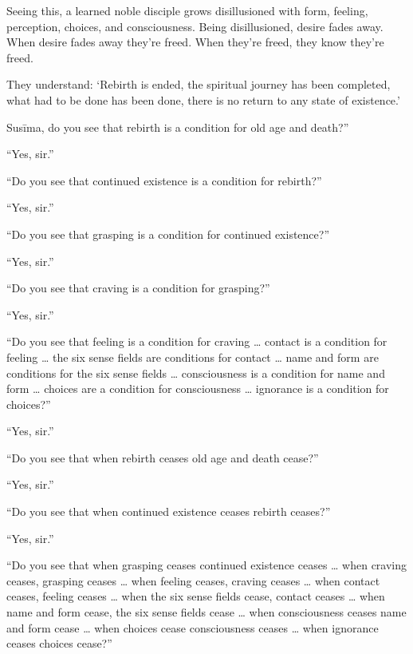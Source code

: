 \documentclass[12pt,openany]{book}%
\begin{document}
Seeing this, a learned noble disciple grows disillusioned with form, feeling, perception, choices, and consciousness. Being disillusioned, desire fades away. When desire fades away they’re freed. When they’re freed, they know they’re freed. 

They understand: ‘Rebirth is ended, the spiritual journey has been completed, what had to be done has been done, there is no return to any state of existence.’ 

\textsanskrit{Susīma}, do you see that rebirth is a condition for old age and death?” 

“Yes, sir.” 

“Do you see that continued existence is a condition for rebirth?” 

“Yes, sir.” 

“Do you see that grasping is a condition for continued existence?” 

“Yes, sir.” 

“Do you see that craving is a condition for grasping?” 

“Yes, sir.” 

“Do you see that feeling is a condition for craving … contact is a condition for feeling … the six sense fields are conditions for contact … name and form are conditions for the six sense fields … consciousness is a condition for name and form … choices are a condition for consciousness … ignorance is a condition for choices?” 

“Yes, sir.” 

“Do you see that when rebirth ceases old age and death cease?” 

“Yes, sir.” 

“Do you see that when continued existence ceases rebirth ceases?” 

“Yes, sir.” 

“Do you see that when grasping ceases continued existence ceases … when craving ceases, grasping ceases … when feeling ceases, craving ceases … when contact ceases, feeling ceases … when the six sense fields cease, contact ceases … when name and form cease, the six sense fields cease … when consciousness ceases name and form cease … when choices cease consciousness ceases … when ignorance ceases choices cease?” 
\end{document}
